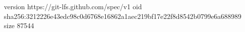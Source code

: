 version https://git-lfs.github.com/spec/v1
oid sha256:3212226e43edc98c0d6768e16862a1aec219bf17e22f8d8542b0799e6a688989
size 87544
